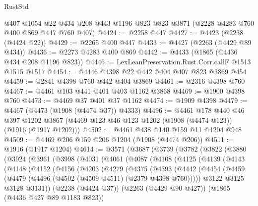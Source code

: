 \begin{lexlean}{RustStd}
\begin{coremodule}
    @407
    @1054
    @22
    @434
    @208
    @443
    @1196
    @823
    @823
    @3871
    (@2228 @4283 @760 @400 @869 @447 @760 @407)
@4424 := @2258 @447
@4427 := @4423 (@2238 (@4424 @22))
@4429 := @2265 @400 @447
@4433 := @4427 (@2263 (@4429 @89 @434))
@4436 := @2273 @4283 @400 @869
@4442 := @4433 (@1865 (@4436 @434 @208 @1196 @823))
@4446 := LexLeanPreservation.Rust.Corr.callF @1513 @1515 @1517
@4454 := @4446 @4398 @22 @442 @404 @407 @823 @3869 @454
@4459 := @2841 @4398 @760 @442 @404 @3869
@4461 := @2316 @4398 @760
@4467 := @4461 @103 @441 @401 @403 @1162 @3868
@4469 := @1900 @4398 @760
@4473 := @4469 @37 @401 @37 @1162
@4474 := @1909 @4398
@4479 := @4467 (@4473 (@1908 (@4474 @37)) @4333)
@4496 := @4461
    @178
    @440
    @46
    @397
    @1202
    @3867
    (@4469 @123 @46 @123 @1202 (@1908 (@4474 @123)) (@1916 (@1917 @1202)))
@4502 := @4461 @438 @140 @159 @11 @1204 @948
@4509 := @4469 @206 @159 @206 @1204 (@1908 (@4474 @206))
@4511 := @1916 (@1917 @1204)
@4614 := @3571
    (@3687
      (@3739
        (@3782
          (@3822
            (@3880
              (@3924
                (@3961
                  (@3998
                    (@4031
                      (@4061
                        (@4087
                          (@4108
                            (@4125
                              (@4139
                                (@4143
                                  (@4148
                                    (@4152
                                      (@4156
                                        (@4203
                                          (@4279
                                            (@4375
                                              (@4393
                                                (@4442
                                                  (@4454
                                                    (@4459
                                                      (@4479
                                                        (@4496
                                                          (@4502
                                                            (@4509 @4511)
                                                            (@2379 @4398 @760)))))
                                                    @3122
                                                    @3125
                                                    @3128
                                                    @3131))
                                                (@2238 (@4424 @37))
                                                (@2263 (@4429 @90 @427))
                                                (@1865 (@4436 @427 @89 @1183 @823))

\end{coremodule}
\end{lexlean}
